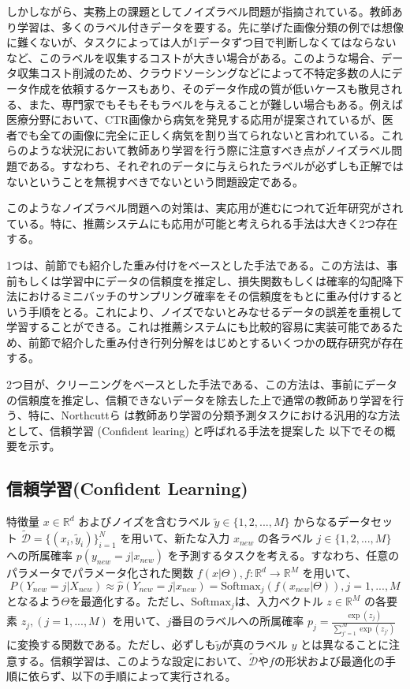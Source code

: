 \documentclass[11pt,a4paper]{article}
\begin{document}
しかしながら、実務上の課題としてノイズラベル問題が指摘されている。教師あり学習は、多くのラベル付きデータを要する。先に挙げた画像分類の例では想像に難くないが、タスクによっては人が1データずつ目で判断しなくてはならないなど、このラベルを収集するコストが大きい場合がある。このような場合、データ収集コスト削減のため、クラウドソーシングなどによって不特定多数の人にデータ作成を依頼するケースもあり、そのデータ作成の質が低いケースも散見される、また、専門家でもそもそもラベルを与えることが難しい場合もある。例えば医療分野において、CTR画像から病気を発見する応用が提案されているが、医者でも全ての画像に完全に正しく病気を割り当てられないと言われている。これらのような状況において教師あり学習を行う際に注意すべき点がノイズラベル問題である。すなわち、それぞれのデータに与えられたラベルが必ずしも正解ではないということを無視すべきでないという問題設定である。

このようなノイズラベル問題への対策は、実応用が進むにつれて近年研究がされている。特に、推薦システムにも応用が可能と考えられる手法は大きく2つ存在する。

1つは、前節でも紹介した重み付けをベースとした手法である。この方法は、事前もしくは学習中にデータの信頼度を推定し、損失関数もしくは確率的勾配降下法におけるミニバッチのサンプリング確率をその信頼度をもとに重み付けするという手順をとる。これにより、ノイズでないとみなせるデータの誤差を重視して学習することができる。これは推薦システムにも比較的容易に実装可能であるため、前節で紹介した重み付き行列分解をはじめとするいくつかの既存研究が存在する。

2つ目が、クリーニングをベースとした手法である、この方法は、事前にデータの信頼度を推定し、信頼できないデータを除去した上で通常の教師あり学習を行う、特に、Northcuttら は教師あり学習の分類予測タスクにおける汎用的な方法として、信頼学習 (Confident learing) と呼ばれる手法を提案した \cite{32} 以下でその概要を示す。

\subsection{信頼学習(Confident Learning)}
特徴量 $x\in\mathbb{R}^{d}$ およびノイズを含むラベル $\tilde{y}\in\{1,2,...,M\}$ からなるデータセット $\tilde{\mathcal{D}}=\{(x_{i},\tilde{y}_{i})\}_{i=1}^{N}$ を用いて、新たな入力 $x_{new}$ の各ラベル $j\in\{1,2,...,M\}$ への所属確率 $p(y_{new}=j|x_{new})$ を予測するタスクを考える。すなわち、任意のパラメータでパラメータ化された関数 $f(x|\Theta),f:\mathbb{R}^{d}\rightarrow\mathbb{R}^{M}$ を用いて、
$$P(Y_{new}=j|X_{new}) \approx\hat{p}(Y_{new} = j|x_{new}) = \text{Softmax}_{j}(f(x_{new}|\Theta)), j = 1,..., M$$
となるよう$\Theta$を最適化する。ただし、$\text{Softmax}_{j}$は、入力ベクトル $z\in\mathbb{R}^{M}$ の各要素 $z_{j},(j=1,...,M)$ を用いて、$j$番目のラベルへの所属確率 $p_{j}=\frac{\exp(z_{j})}{\sum_{j'=1}^{M}\exp(z_{j'})}$ に変換する関数である。ただし、必ずしも$\tilde{y}$が真のラベル $y$ とは異なることに注意する。信頼学習は、このような設定において、$\tilde{\mathcal{D}}$や$f$の形状および最適化の手順に依らず、以下の手順によって実行される。
\end{document}
